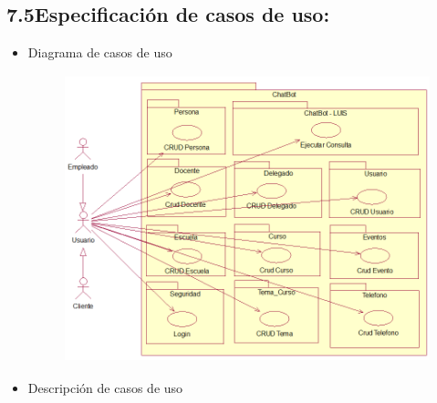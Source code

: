 \documentclass[12pt]{report}
\begin{document}
\subsection*{7.5\hspace*{10pt}Especificación de casos de uso:}
\begin{itemize}
	\item {\fontsize{10pt}{12.0pt}\selectfont Diagrama de casos de uso\par}\par




\begin{figure}[H]
	\begin{Center}
		\includegraphics[width=4.23in,height=3.29in]{./media/image7.png}
	\end{Center}
\end{figure}



\par

	\item {\fontsize{10pt}{12.0pt}\selectfont Descripción de casos de uso\par}
\end{itemize}\par



\end{document}
